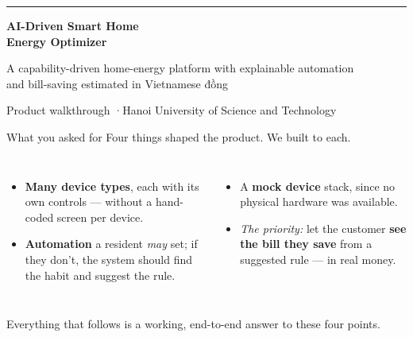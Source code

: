 \documentclass[aspectratio=169,11pt]{beamer}
\newcommand{\kw}[1]{\textcolor{accent}{\textbf{#1}}}
\begin{document}
{
\begin{frame}[plain]
  \vfill
  {\color{accent}\rule{\textwidth}{1.6pt}}\par\vspace{0.7em}
  {\Huge\bfseries AI-Driven Smart Home\\[2pt]Energy Optimizer}\par
  \vspace{0.5em}
  {\large\color{mut} A capability-driven home-energy platform with explainable
   automation\\ and bill-saving estimated in Vietnamese đồng}\par
  \vspace{0.5em}{\color{accent}\rule{\textwidth}{1.6pt}}
  \vfill
  {\small\color{mut} Product walkthrough \quad·\quad Hanoi University of Science and Technology}
  \vfill
\end{frame}
}

\begin{frame}{What you asked for}
  \vspace{0.3em}
  Four things shaped the product. We built to each.
  \vspace{0.8em}

  \begin{columns}[T]
    \begin{itemize}\setlength\itemsep{0.7em}
      \item \kw{Many device types}, each with its own controls — without a hand-coded
            screen per device.
      \item \kw{Automation} a resident \emph{may} set; if they don't, the system should
            find the habit and suggest the rule.
    \end{itemize}
    \begin{itemize}\setlength\itemsep{0.7em}
      \item A \kw{mock device} stack, since no physical hardware was available.
      \item \emph{The priority:} let the customer \kw{see the bill they save} from a
            suggested rule — in real money.
    \end{itemize}
  \end{columns}

  \vspace{1.0em}
  \begin{center}
  {\color{mut}\small Everything that follows is a working, end-to-end answer to these four points.}
  \end{center}
\end{frame}
\end{document}
